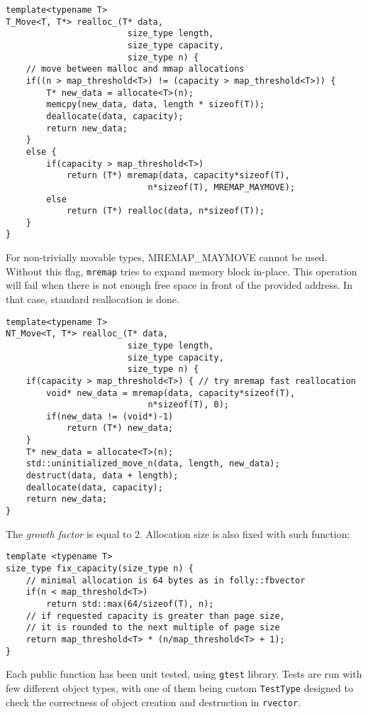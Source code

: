 \documentclass[inz, english, shortabstract]{iithesis}
\begin{document}
\begin{lstlisting}[caption=rvector trivial type reallocation]
template<typename T>
T_Move<T, T*> realloc_(T* data, 
						size_type length, 
						size_type capacity, 
						size_type n) {
	// move between malloc and mmap allocations
	if((n > map_threshold<T>) != (capacity > map_threshold<T>)) {
        T* new_data = allocate<T>(n);
        memcpy(new_data, data, length * sizeof(T));
        deallocate(data, capacity);
        return new_data;
    }
    else {
        if(capacity > map_threshold<T>)
        	return (T*) mremap(data, capacity*sizeof(T), 
                    		n*sizeof(T), MREMAP_MAYMOVE);
        else
        	return (T*) realloc(data, n*sizeof(T));
    }
}
\end{lstlisting}
For non-trivially movable types, MREMAP\_MAYMOVE cannot be used. Without this flag, {\tt mremap} tries to expand memory block in-place. This operation will fail when there is not enough free space in front of the provided address. In that case, standard reallocation is done.

\begin{lstlisting}[caption=rvector nontrivial type reallocation]
template<typename T>
NT_Move<T, T*> realloc_(T* data, 
						size_type length, 
						size_type capacity, 
						size_type n) {
    if(capacity > map_threshold<T>) { // try mremap fast reallocation
        void* new_data = mremap(data, capacity*sizeof(T), 
                    		n*sizeof(T), 0);
        if(new_data != (void*)-1)
        	return (T*) new_data;
    }
    T* new_data = allocate<T>(n);
    std::uninitialized_move_n(data, length, new_data);
    destruct(data, data + length);
    deallocate(data, capacity);
    return new_data;
}
\end{lstlisting}
The \emph{growth factor} is equal to 2. Allocation size is also fixed with such function: 

\begin{lstlisting}[caption=fix capacity]
template <typename T>
size_type fix_capacity(size_type n) {
	// minimal allocation is 64 bytes as in folly::fbvector
	if(n < map_threshold<T>)
        return std::max(64/sizeof(T), n);
    // if requested capacity is greater than page size,
    // it is rounded to the next multiple of page size
    return map_threshold<T> * (n/map_threshold<T> + 1);
}
\end{lstlisting}
Each public function has been unit tested, using {\tt gtest} library\cite{rvector_tests}. Tests are run with few different object types, with one of them being custom {\tt TestType} designed to check the correctness of object creation and destruction in {\tt rvector}.
\end{document}
